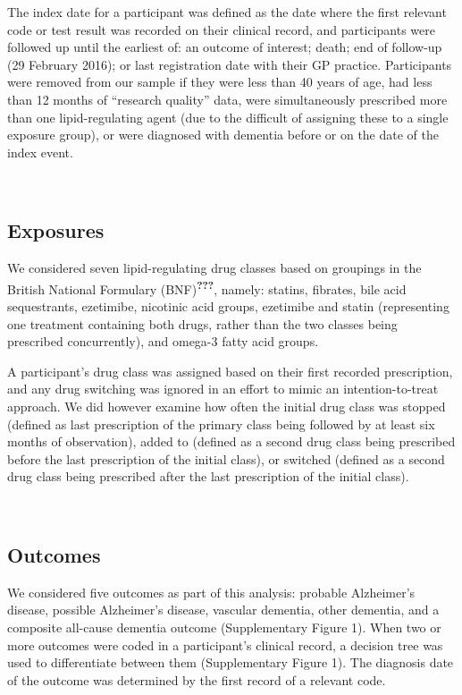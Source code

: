 \documentclass[a4paper, twoside]{templates/ociamthesis}
\begin{document}
The index date for a participant was defined as the date where the first relevant code or test result was recorded on their clinical record, and participants were followed up until the earliest of: an outcome of interest; death; end of follow-up (29 February 2016); or last registration date with their GP practice. Participants were removed from our sample if they were less than 40 years of age, had less than 12 months of ``research quality'' data, were simultaneously prescribed more than one lipid-regulating agent (due to the difficult of assigning these to a single exposure group), or were diagnosed with dementia before or on the date of the index event.

~

\hypertarget{exposures}{%
\subsection{Exposures}\label{exposures}}

We considered seven lipid-regulating drug classes based on groupings in the British National Formulary (BNF)\textsuperscript{{\textbf{???}}}, namely: statins, fibrates, bile acid sequestrants, ezetimibe, nicotinic acid groups, ezetimibe and statin (representing one treatment containing both drugs, rather than the two classes being prescribed concurrently), and omega-3 fatty acid groups.

A participant's drug class was assigned based on their first recorded prescription, and any drug switching was ignored in an effort to mimic an intention-to-treat approach. We did however examine how often the initial drug class was stopped (defined as last prescription of the primary class being followed by at least six months of observation), added to (defined as a second drug class being prescribed before the last prescription of the initial class), or switched (defined as a second drug class being prescribed after the last prescription of the initial class).

~

\hypertarget{outcomes}{%
\subsection{Outcomes}\label{outcomes}}

We considered five outcomes as part of this analysis: probable Alzheimer's disease, possible Alzheimer's disease, vascular dementia, other dementia, and a composite all-cause dementia outcome (Supplementary Figure 1). When two or more outcomes were coded in a participant's clinical record, a decision tree was used to differentiate between them (Supplementary Figure 1). The diagnosis date of the outcome was determined by the first record of a relevant code.
\end{document}
